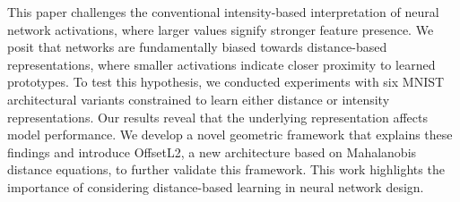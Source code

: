 This paper challenges the conventional intensity-based interpretation of neural network activations, where larger values signify stronger feature presence. We posit that networks are fundamentally biased towards distance-based representations, where smaller activations indicate closer proximity to learned prototypes. To test this hypothesis, we conducted experiments with six MNIST architectural variants constrained to learn either distance or intensity representations. Our results reveal that the underlying representation affects model performance. We develop a novel geometric framework that explains these findings and introduce OffsetL2, a new architecture based on Mahalanobis distance equations, to further validate this framework. This work highlights the importance of considering distance-based learning in neural network design.
